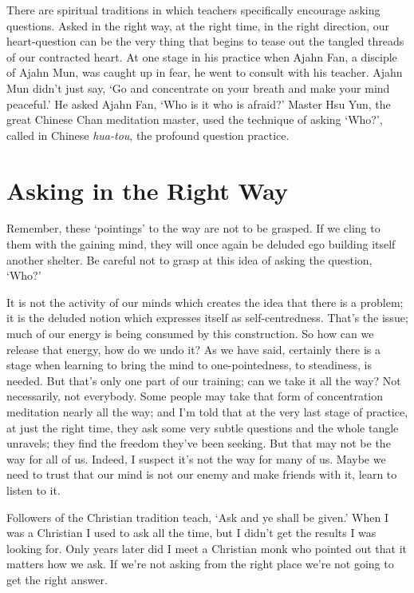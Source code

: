 There are spiritual traditions in which teachers specifically encourage
asking questions. Asked in the right way, at the right time, in the
right direction, our heart-question can be the very thing that begins to
tease out the tangled threads of our contracted heart. At one stage in
his practice when Ajahn Fan, a disciple of Ajahn Mun, was caught up in
fear, he went to consult with his teacher. Ajahn Mun didn’t just say,
‘Go and concentrate on your breath and make your mind peaceful.’ He
asked Ajahn Fan, ‘Who is it who is afraid?’ Master Hsu Yun,\cite{hsu-yun} the
great Chinese Chan meditation master, used the technique of asking
‘Who?’, called in Chinese \emph{hua-tou}, the profound question practice.

\section{Asking in the Right Way}

Remember, these ‘pointings’ to the way are not to be grasped. If we
cling to them with the gaining mind, they will once again be deluded ego
building itself another shelter. Be careful not to grasp at this idea of
asking the question, ‘Who?’

It is not the activity of our minds which creates the idea that there is
a problem; it is the deluded notion which expresses itself as
self-centredness. That’s the issue; much of our energy is being consumed
by this construction. So how can we release that energy, how do we undo
it? As we have said, certainly there is a stage when learning to bring
the mind to one-pointedness, to steadiness, is needed. But that’s only
one part of our training; can we take it all the way? Not necessarily,
not everybody. Some people may take that form of concentration
meditation nearly all the way; and I’m told that at the very last stage
of practice, at just the right time, they ask some very subtle questions
and the whole tangle unravels; they find the freedom they’ve been
seeking. But that may not be the way for all of us. Indeed, I suspect
it’s not the way for many of us. Maybe we need to trust that our mind is
not our enemy and make friends with it, learn to listen to it.

Followers of the Christian tradition teach, ‘Ask and ye shall be given.’
When I was a Christian I used to ask all the time, but I didn’t get the
results I was looking for. Only years later did I meet a Christian monk
who pointed out that it matters how we ask. If we’re not asking from the
right place we’re not going to get the right answer.

